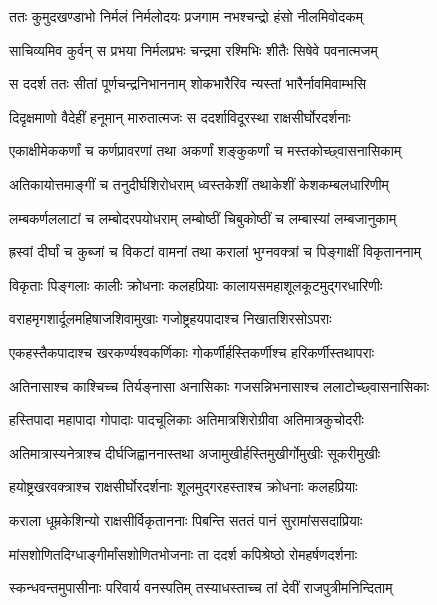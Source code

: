
\twolineshloka
{ततः कुमुदखण्डाभो निर्मलं निर्मलोदयः}
{प्रजगाम नभश्चन्द्रो हंसो नीलमिवोदकम्} %

\twolineshloka
{साचिव्यमिव कुर्वन् स प्रभया निर्मलप्रभः}
{चन्द्रमा रश्मिभिः शीतैः सिषेवे पवनात्मजम्} %

\twolineshloka
{स ददर्श ततः सीतां पूर्णचन्द्रनिभाननाम्}
{शोकभारैरिव न्यस्तां भारैर्नावमिवाम्भसि} %

\twolineshloka
{दिदृक्षमाणो वैदेहीं हनूमान् मारुतात्मजः}
{स ददर्शाविदूरस्था राक्षसीर्घोरदर्शनाः} %

\twolineshloka
{एकाक्षीमेककर्णां च कर्णप्रावरणां तथा}
{अकर्णां शङ्कुकर्णां च मस्तकोच्छ्वासनासिकाम्} %

\twolineshloka
{अतिकायोत्तमाङ्गीं च तनुदीर्घशिरोधराम्}
{ध्वस्तकेशीं तथाकेशीं केशकम्बलधारिणीम्} %

\twolineshloka
{लम्बकर्णललाटां च लम्बोदरपयोधराम्}
{लम्बोष्ठीं चिबुकोष्ठीं च लम्बास्यां लम्बजानुकाम्} %

\twolineshloka
{ह्रस्वां दीर्घां च कुब्जां च विकटां वामनां तथा}
{करालां भुग्नवक्त्रां च पिङ्गाक्षीं विकृताननाम्} %

\twolineshloka
{विकृताः पिङ्गलाः कालीः क्रोधनाः कलहप्रियाः}
{कालायसमहाशूलकूटमुद्गरधारिणीः} %

\twolineshloka
{वराहमृगशार्दूलमहिषाजशिवामुखाः}
{गजोष्ट्रहयपादाश्च निखातशिरसोऽपराः} %

\twolineshloka
{एकहस्तैकपादाश्च खरकर्ण्यश्वकर्णिकाः}
{गोकर्णीर्हस्तिकर्णीश्च हरिकर्णीस्तथापराः} %

\twolineshloka
{अतिनासाश्च काश्चिच्च तिर्यङ्नासा अनासिकाः}
{गजसन्निभनासाश्च ललाटोच्छ्वासनासिकाः} %

\twolineshloka
{हस्तिपादा महापादा गोपादाः पादचूलिकाः}
{अतिमात्रशिरोग्रीवा अतिमात्रकुचोदरीः} %

\twolineshloka
{अतिमात्रास्यनेत्राश्च दीर्घजिह्वाननास्तथा}
{अजामुखीर्हस्तिमुखीर्गोमुखीः सूकरीमुखीः} %

\twolineshloka
{हयोष्ट्रखरवक्त्राश्च राक्षसीर्घोरदर्शनाः}
{शूलमुद्गरहस्ताश्च क्रोधनाः कलहप्रियाः} %

\twolineshloka
{कराला धूम्रकेशिन्यो राक्षसीर्विकृताननाः}
{पिबन्ति सततं पानं सुरामांससदाप्रियाः} %

\twolineshloka
{मांसशोणितदिग्धाङ्गीर्मांसशोणितभोजनाः}
{ता ददर्श कपिश्रेष्ठो रोमहर्षणदर्शनाः} %

\twolineshloka
{स्कन्धवन्तमुपासीनाः परिवार्य वनस्पतिम्}
{तस्याधस्ताच्च तां देवीं राजपुत्रीमनिन्दिताम्} %

